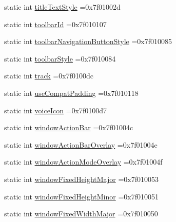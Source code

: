 \begin{DoxyCompactItemize}
\item 
static int \hyperlink{classandroid_1_1support_1_1graphics_1_1drawable_1_1animated_1_1R_1_1attr_a1e7e09dd1ab4acaa50be27767345b14b}{title\+Text\+Style} =0x7f01002d
\item 
static int \hyperlink{classandroid_1_1support_1_1graphics_1_1drawable_1_1animated_1_1R_1_1attr_a7d8548465d87b6939943734cd62a54b5}{toolbar\+Id} =0x7f010107
\item 
static int \hyperlink{classandroid_1_1support_1_1graphics_1_1drawable_1_1animated_1_1R_1_1attr_af05d25dc6128f8adc3368febbffa8a0b}{toolbar\+Navigation\+Button\+Style} =0x7f010085
\item 
static int \hyperlink{classandroid_1_1support_1_1graphics_1_1drawable_1_1animated_1_1R_1_1attr_acb8fae82ea17936d4ed3d129b72e4afc}{toolbar\+Style} =0x7f010084
\item 
static int \hyperlink{classandroid_1_1support_1_1graphics_1_1drawable_1_1animated_1_1R_1_1attr_ab52f19b98d5a5575722eb04df5f6468d}{track} =0x7f0100dc
\item 
static int \hyperlink{classandroid_1_1support_1_1graphics_1_1drawable_1_1animated_1_1R_1_1attr_aac39a6b976e45f8f1f49ecbe8989f2c6}{use\+Compat\+Padding} =0x7f010118
\item 
static int \hyperlink{classandroid_1_1support_1_1graphics_1_1drawable_1_1animated_1_1R_1_1attr_acdf60e4a92fa30ceeeb49f25b08a128d}{voice\+Icon} =0x7f0100d7
\item 
static int \hyperlink{classandroid_1_1support_1_1graphics_1_1drawable_1_1animated_1_1R_1_1attr_a52a2f5e65e54f9b6f0690329a0b49931}{window\+Action\+Bar} =0x7f01004c
\item 
static int \hyperlink{classandroid_1_1support_1_1graphics_1_1drawable_1_1animated_1_1R_1_1attr_a72b49d83a662a9a92448e47398ae3513}{window\+Action\+Bar\+Overlay} =0x7f01004e
\item 
static int \hyperlink{classandroid_1_1support_1_1graphics_1_1drawable_1_1animated_1_1R_1_1attr_ab6ec8fb8c28d7f949f1a44e9713f7004}{window\+Action\+Mode\+Overlay} =0x7f01004f
\item 
static int \hyperlink{classandroid_1_1support_1_1graphics_1_1drawable_1_1animated_1_1R_1_1attr_abf67c94f7ca9e8eef6ca90d33ceb4dc1}{window\+Fixed\+Height\+Major} =0x7f010053
\item 
static int \hyperlink{classandroid_1_1support_1_1graphics_1_1drawable_1_1animated_1_1R_1_1attr_a09c84c88c489f1c3cae7d527c75c6e77}{window\+Fixed\+Height\+Minor} =0x7f010051
\item 
static int \hyperlink{classandroid_1_1support_1_1graphics_1_1drawable_1_1animated_1_1R_1_1attr_a7f0dff1b79ada0d3e5c357c8b226a75a}{window\+Fixed\+Width\+Major} =0x7f010050

\end{DoxyCompactItemize}
